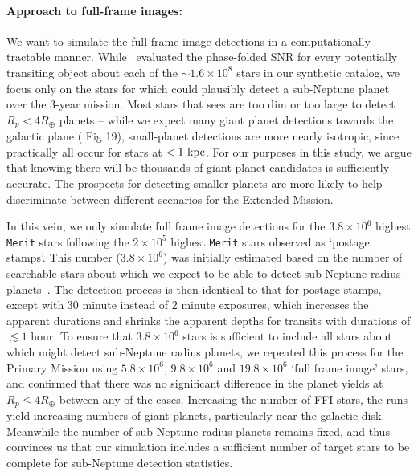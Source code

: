 \paragraph{Approach to full-frame images:}
\label{sec:FFI_simulation}
We want to simulate the full frame image detections in a
computationally tractable manner.  While~
evaluated the phase-folded SNR for every potentially transiting object
about each of the $\sim\!1.6\times10^8$ stars in our synthetic catalog,
we focus only on the stars for which \tess could plausibly detect a
sub-Neptune planet over the 3-year mission.  Most stars that
\tess sees are too dim or too large to detect $R_p<4R_\oplus$ planets
-- while we expect many giant planet detections towards the galactic
plane ( Fig 19), small-planet detections are
more nearly isotropic, since practically all occur for stars at
$<1\rm\ kpc$.  For our purposes in this study, we argue that knowing
there will be thousands of giant planet candidates is sufficiently
accurate. The prospects for detecting smaller planets are more likely
to help discriminate between different scenarios for the Extended Mission.

In this vein, we only simulate full frame image detections for the
$3.8\times10^6$ highest \texttt{Merit} stars following the
$2\times10^5$ highest \texttt{Merit} stars observed as `postage
stamps'.  This number ($3.8\times10^6$) was initially estimated based
on the number of searchable stars about which we expect \tess to be
able to detect sub-Neptune radius
planets~\citep{winn_searchable_2013}.  The detection process is then
identical to that for postage stamps, except with 30 minute instead of
2 minute exposures, which increases the apparent durations and shrinks
the apparent depths for transits with durations of $\lesssim 1$ hour.
To ensure that $3.8\times10^6$ stars is sufficient to include all
stars about which \tess might detect sub-Neptune radius planets, we
repeated this process for the Primary Mission using $5.8\times10^6$,
$9.8\times10^6$ and $19.8\times10^6$ `full frame image' stars, and
confirmed that there was no significant difference in the planet
yields at $R_p\le4R_\oplus$ between any of the cases.
Increasing the number of FFI stars, the runs yield
increasing numbers of giant planets, particularly near the galactic
disk.  Meanwhile the number of sub-Neptune radius planets remains
fixed, and thus convinces us that our simulation includes a sufficient
number of target stars to be complete for sub-Neptune detection statistics.
